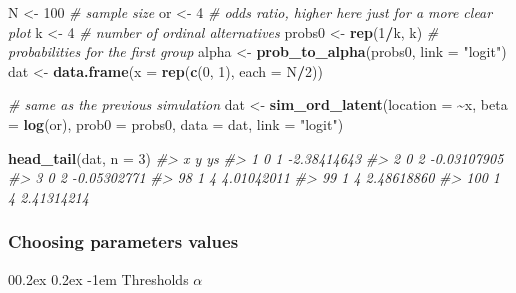 \documentclass[
  man,floatsintext]{apa6}
\makeatletter
\newenvironment{Shaded}{\begin{snugshade}}{\end{snugshade}}
\newcommand{\AttributeTok}[1]{\textcolor[rgb]{0.13,0.29,0.53}{#1}}
\newcommand{\CommentTok}[1]{\textcolor[rgb]{0.56,0.35,0.01}{\textit{#1}}}
\newcommand{\DecValTok}[1]{\textcolor[rgb]{0.00,0.00,0.81}{#1}}
\newcommand{\FunctionTok}[1]{\textcolor[rgb]{0.13,0.29,0.53}{\textbf{#1}}}
\newcommand{\NormalTok}[1]{#1}
\newcommand{\OtherTok}[1]{\textcolor[rgb]{0.56,0.35,0.01}{#1}}
\newcommand{\SpecialCharTok}[1]{\textcolor[rgb]{0.81,0.36,0.00}{\textbf{#1}}}
\newcommand{\StringTok}[1]{\textcolor[rgb]{0.31,0.60,0.02}{#1}}
\let\oldparagraph\paragraph
\renewcommand{\paragraph}[1]{\oldparagraph{#1}\mbox{}}
\renewcommand{\paragraph}{\@startsection{paragraph}{4}{\parindent}%
  {0\baselineskip \@plus 0.2ex \@minus 0.2ex}%
  {-1em}%
  {\normalfont\normalsize\bfseries\itshape\typesectitle}}
\makeatother
\begin{document}
\scriptsize

\begin{Shaded}
\begin{Highlighting}[]
\NormalTok{N }\OtherTok{\textless{}{-}} \DecValTok{100} \CommentTok{\# sample size}
\NormalTok{or }\OtherTok{\textless{}{-}} \DecValTok{4} \CommentTok{\# odds ratio, higher here just for a more clear plot}
\NormalTok{k }\OtherTok{\textless{}{-}} \DecValTok{4} \CommentTok{\# number of ordinal alternatives}
\NormalTok{probs0 }\OtherTok{\textless{}{-}} \FunctionTok{rep}\NormalTok{(}\DecValTok{1}\SpecialCharTok{/}\NormalTok{k, k) }\CommentTok{\# probabilities for the first group}
\NormalTok{alpha }\OtherTok{\textless{}{-}} \FunctionTok{prob\_to\_alpha}\NormalTok{(probs0, }\AttributeTok{link =} \StringTok{"logit"}\NormalTok{)}
\NormalTok{dat }\OtherTok{\textless{}{-}} \FunctionTok{data.frame}\NormalTok{(}\AttributeTok{x =} \FunctionTok{rep}\NormalTok{(}\FunctionTok{c}\NormalTok{(}\DecValTok{0}\NormalTok{, }\DecValTok{1}\NormalTok{), }\AttributeTok{each =}\NormalTok{ N}\SpecialCharTok{/}\DecValTok{2}\NormalTok{))}

\CommentTok{\# same as the previous simulation}
\NormalTok{dat }\OtherTok{\textless{}{-}} \FunctionTok{sim\_ord\_latent}\NormalTok{(}\AttributeTok{location =} \SpecialCharTok{\textasciitilde{}}\NormalTok{x, }\AttributeTok{beta =} \FunctionTok{log}\NormalTok{(or), }\AttributeTok{prob0 =}\NormalTok{ probs0, }\AttributeTok{data =}\NormalTok{ dat, }\AttributeTok{link =} \StringTok{"logit"}\NormalTok{)}

\FunctionTok{head\_tail}\NormalTok{(dat, }\AttributeTok{n =} \DecValTok{3}\NormalTok{)}
\CommentTok{\#\textgreater{}     x y          ys}
\CommentTok{\#\textgreater{} 1   0 1 {-}2.38414643}
\CommentTok{\#\textgreater{} 2   0 2 {-}0.03107905}
\CommentTok{\#\textgreater{} 3   0 2 {-}0.05302771}
\CommentTok{\#\textgreater{} 98  1 4  4.01042011}
\CommentTok{\#\textgreater{} 99  1 4  2.48618860}
\CommentTok{\#\textgreater{} 100 1 4  2.41314214}
\end{Highlighting}
\end{Shaded}

\normalsize

\subsubsection{Choosing parameters values}\label{choosing-parameters-values}

\paragraph{\texorpdfstring{Thresholds \(\alpha\)}{Thresholds \textbackslash alpha}}\label{thresholds-alpha}
\end{document}
